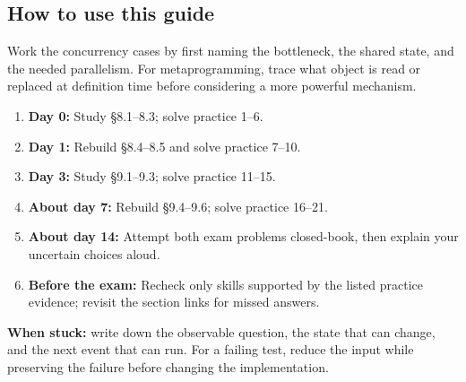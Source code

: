\documentclass[11pt]{article}
\begin{document}
\begin{keepsection}
\section{How to use this guide}

Work the concurrency cases by first naming the bottleneck, the shared state, and the needed parallelism. For metaprogramming, trace what object is read or replaced at definition time before considering a more powerful mechanism.

\begin{enumerate}
\item \textbf{Day 0:} Study §8.1–8.3; solve practice 1–6.
\item \textbf{Day 1:} Rebuild §8.4–8.5 and solve practice 7–10.
\item \textbf{Day 3:} Study §9.1–9.3; solve practice 11–15.
\item \textbf{About day 7:} Rebuild §9.4–9.6; solve practice 16–21.
\item \textbf{About day 14:} Attempt both exam problems closed-book, then explain your uncertain choices aloud.
\item \textbf{Before the exam:} Recheck only skills supported by the listed practice evidence; revisit the section links for missed answers.
\end{enumerate}

\begin{notebox}\textbf{When stuck:} write down the observable question, the state that can change, and the next event that can run. For a failing test, reduce the input while preserving the failure before changing the implementation.\end{notebox}
\end{keepsection}
\end{document}
